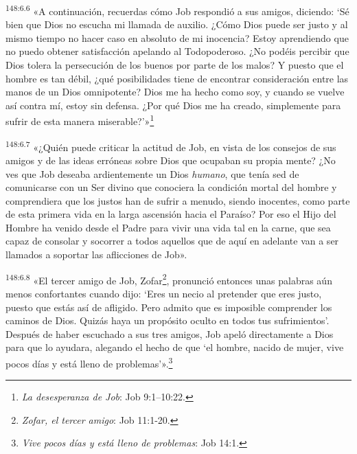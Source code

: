\par
\textsuperscript{148:6.6} «A continuación, recuerdas cómo Job respondió a sus amigos, diciendo: `Sé bien que Dios no escucha mi llamada de auxilio. ¿Cómo Dios puede ser justo y al mismo tiempo no hacer caso en absoluto de mi inocencia? Estoy aprendiendo que no puedo obtener satisfacción apelando al Todopoderoso. ¿No podéis percibir que Dios tolera la persecución de los buenos por parte de los malos? Y puesto que el hombre es tan débil, ¿qué posibilidades tiene de encontrar consideración entre las manos de un Dios omnipotente? Dios me ha hecho como soy, y cuando se vuelve así contra mí, estoy sin defensa. ¿Por qué Dios me ha creado, simplemente para sufrir de esta manera miserable?'»\footnote{\textit{La desesperanza de Job}: Job 9:1--10:22.}

\par
\textsuperscript{148:6.7} «¿Quién puede criticar la actitud de Job, en vista de los consejos de sus amigos y de las ideas erróneas sobre Dios que ocupaban su propia mente? ¿No ves que Job deseaba ardientemente un Dios \textit{humano}, que tenía sed de comunicarse con un Ser divino que conociera la condición mortal del hombre y comprendiera que los justos han de sufrir a menudo, siendo inocentes, como parte de esta primera vida en la larga ascensión hacia el Paraíso? Por eso el Hijo del Hombre ha venido desde el Padre para vivir una vida tal en la carne, que sea capaz de consolar y socorrer a todos aquellos que de aquí en adelante van a ser llamados a soportar las aflicciones de Job».

\par
\textsuperscript{148:6.8} «El tercer amigo de Job, Zofar\footnote{\textit{Zofar, el tercer amigo}: Job 11:1-20.}, pronunció entonces unas palabras aún menos confortantes cuando dijo: `Eres un necio al pretender que eres justo, puesto que estás así de afligido. Pero admito que es imposible comprender los caminos de Dios. Quizás haya un propósito oculto en todos tus sufrimientos'. Después de haber escuchado a sus tres amigos, Job apeló directamente a Dios para que lo ayudara, alegando el hecho de que `el hombre, nacido de mujer, vive pocos días y está lleno de problemas'».\footnote{\textit{Vive pocos días y está lleno de problemas}: Job 14:1.}

